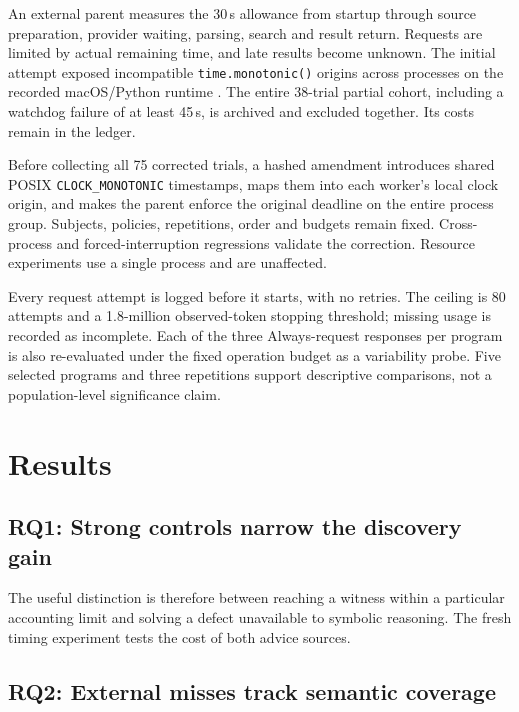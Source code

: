 \documentclass[sigconf]{acmart}
\begin{document}
An external parent measures the 30\,s allowance from startup through source
preparation, provider waiting, parsing, search and result return. Requests
are limited by actual remaining time, and late results become unknown.
The initial attempt exposed incompatible \texttt{time.monotonic()} origins
across processes on the recorded macOS/Python runtime \cite{python-time}.
The entire 38-trial partial cohort, including a watchdog failure of at least
45\,s, is archived and excluded together. Its costs remain in the ledger.

Before collecting all 75 corrected trials, a hashed amendment introduces
shared POSIX \texttt{CLOCK\_MONOTONIC} timestamps, maps them into each worker's
local clock origin, and makes the parent enforce the original deadline on
the entire process group. Subjects, policies, repetitions, order and budgets
remain fixed. Cross-process and forced-interruption regressions validate
the correction. Resource experiments use a single process and are unaffected.

Every request attempt is logged before it starts, with no retries. The
ceiling is 80 attempts and a 1.8-million observed-token stopping threshold;
missing usage is recorded as incomplete. Each of the three Always-request
responses per program is also re-evaluated under the fixed operation budget
as a variability probe. Five selected programs and three repetitions support
descriptive comparisons, not a population-level significance claim.

\section{Results}
\label{sec:results}

\subsection{RQ1: Strong controls narrow the discovery gain}
\VFourResource{}

\VFourLoopCase{}
The useful distinction is therefore between reaching a witness within a
particular accounting limit and solving a defect unavailable to symbolic
reasoning. The fresh timing experiment tests the cost of both advice sources.

\subsection{RQ2: External misses track semantic coverage}
\VFourExternal{}
\end{document}
